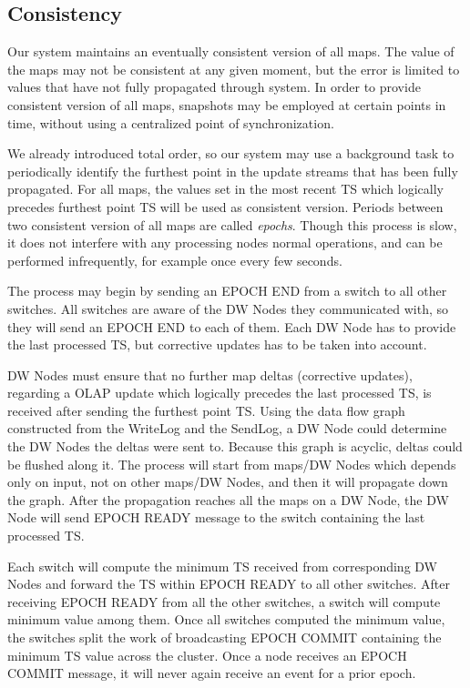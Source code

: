 \documentclass{sig-semester}
\def\OLAP{OLAP\xspace}
\begin{document}
\subsection{Consistency}

Our system maintains an eventually consistent version of all maps. The value of the maps may not be consistent at any given moment, but the error is limited to values that have not fully propagated through system. In order to provide consistent version of all maps, snapshots may be employed at certain points in time, without using a centralized point of synchronization.

We already introduced total order, so our system may use a background task to periodically identify the furthest point in the update streams that has been fully propagated. For all maps, the values set in the most recent TS which logically precedes furthest point TS will be used as consistent version. Periods between two consistent version of all maps are called \textit{epochs}. Though this process is slow, it does not interfere with any processing nodes normal operations, and can be performed infrequently, for example once every few seconds.

The process may begin by sending an EPOCH END from a switch to all other switches. All switches are aware of the DW Nodes they communicated with, so they will send an EPOCH END to each of them. Each DW Node has to provide the last processed TS, but corrective updates has to be taken into account. 

DW Nodes must ensure that no further map deltas (corrective updates), regarding a \OLAP update which logically precedes the last processed TS, is received after sending the furthest point TS. Using the data flow graph constructed from the WriteLog and the SendLog, a DW Node could determine the DW Nodes the deltas were sent to. Because this graph is acyclic, deltas could be flushed along it. The process will start from maps/DW Nodes which depends only on input, not on other maps/DW Nodes, and then it will propagate down the graph. After the propagation reaches all the maps on a DW Node, the DW Node will send EPOCH READY message to the switch containing the last processed TS.

Each switch will compute the minimum TS received from corresponding DW Nodes and forward the TS within EPOCH READY to all other switches. After receiving EPOCH READY from all the other switches, a switch will compute minimum value among them. Once all switches computed the minimum value, the switches split the work of broadcasting EPOCH COMMIT containing the minimum TS value across the cluster. Once a node receives an EPOCH COMMIT message, it will never again receive an event for a prior epoch.
\end{document}
